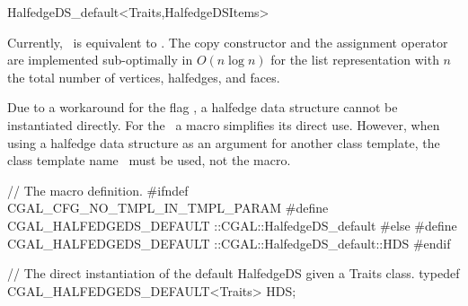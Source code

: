 \begin{ccRefClass}{HalfedgeDS_default<Traits,HalfedgeDSItems>}
\ccImplementation

Currently, \ccRefName\ is equivalent to
. 
The copy constructor and the assignment operator are implemented
sub-optimally in $O(n \log n)$ for the list representation with $n$ the
total number of vertices, halfedges, and faces.

Due to a workaround for the flag ,
a halfedge data structure cannot be instantiated directly. For the
\ccRefName\ a macro simplifies its direct use. However, when using a
halfedge data structure as an argument for another class template,
the class template name \ccRefName\ must be used, not the macro.

\begin{ccExampleCode}
// The macro definition.
#ifndef CGAL_CFG_NO_TMPL_IN_TMPL_PARAM
    #define CGAL_HALFEDGEDS_DEFAULT  ::CGAL::HalfedgeDS_default
#else
    #define CGAL_HALFEDGEDS_DEFAULT  ::CGAL::HalfedgeDS_default::HDS
#endif

// The direct instantiation of the default HalfedgeDS given a Traits class.
typedef CGAL_HALFEDGEDS_DEFAULT<Traits> HDS;
\end{ccExampleCode}

\end{ccRefClass}

\ccRefPageEnd

